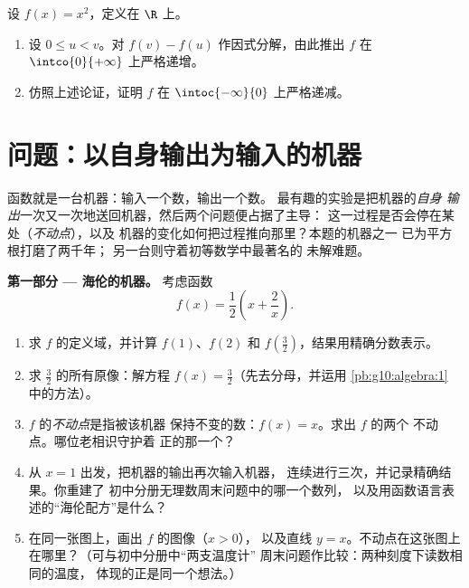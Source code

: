 \begin{exercise}[$\star\star\star$]\label{exo:g10:functions:10}
设 $f(x) = x^2$，定义在 $\R$ 上。
\begin{enumerate}
  \item 设 $0 \leq u < v$。对 $f(v) - f(u)$ 作因式分解，由此推出 $f$ 在
        $\intco{0}{+\infty}$ 上严格递增。
  \item 仿照上述论证，证明 $f$ 在
        $\intoc{-\infty}{0}$ 上严格递减。
\end{enumerate}
\end{exercise}

\section{问题：以自身输出为输入的机器}

\begin{problem}
\label{pb:g10:functions:1}
函数就是一台机器：输入一个数，输出一个数。
最有趣的实验是把机器的\emph{自身
输出}一次又一次地送回机器，然后两个问题便占据了主导：
这一过程是否会停在某处（\emph{不动点}），以及
机器的变化如何把过程推向那里？本题的机器之一
已为平方根打磨了两千年；
另一台则守着初等数学中最著名的
未解难题。

\medskip
\noindent\textbf{第一部分 --- 海伦的机器。}
考虑函数
\[
f(x) = \frac12\left(x + \frac2x\right).
\]
\begin{enumerate}
  \item 求 $f$ 的定义域，并计算 $f(1)$、$f(2)$ 和
        $f\!\left(\frac32\right)$，结果用精确分数表示。
  \item 求 $\frac32$ 的所有原像：解方程
        $f(x) = \frac32$（先去分母，并运用
        \cref{pb:g10:algebra:1} 中的方法）。
  \item $f$ 的\emph{不动点}是指被该机器
        保持不变的数：$f(x) = x$。求出 $f$ 的两个
        不动点。哪位老相识守护着
        正的那一个？
  \item 从 $x = 1$ 出发，把机器的输出再次输入机器，
        连续进行三次，并记录精确结果。你重建了
        初中分册无理数周末问题中的哪一个数列，
        以及用函数语言表述的“海伦配方”是什么？
  \item 在同一张图上，画出 $f$ 的图像（$x > 0$），
        以及直线 $y = x$。不动点在这张图上
        在哪里？（可与初中分册中“两支温度计”
        周末问题作比较：两种刻度下读数相同的温度，
        体现的正是同一个想法。）
\end{enumerate}


\end{problem}
